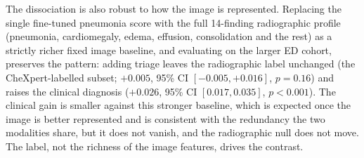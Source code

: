 \documentclass[twocolumn, final]{svjour3}
\begin{document}
The dissociation is also robust to how the image is represented. Replacing the single fine-tuned
pneumonia score with the full 14-finding radiographic profile (pneumonia, cardiomegaly, edema,
effusion, consolidation and the rest) as a strictly richer fixed image baseline, and evaluating
on the larger ED cohort, preserves the pattern: adding triage leaves the radiographic label
unchanged (the CheXpert-labelled subset; $+0.005$, 95\% CI $[-0.005,+0.016]$, $p{=}0.16$) and
raises the clinical diagnosis ($+0.026$, 95\% CI $[0.017,0.035]$, $p<0.001$). The clinical gain is smaller against this
stronger baseline, which is expected once the image is better represented and is consistent with
the redundancy the two modalities share, but it does not vanish, and the radiographic null does
not move. The label, not the richness of the image features, drives the contrast.
\end{document}
